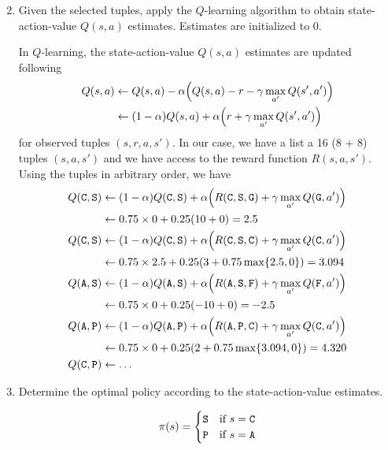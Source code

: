 \documentclass[11pt, a4paper]{article}
\begin{document}
\begin{enumerate}
    \setcounter{enumi}{1}
    \item Given the selected tuples, apply the $Q$-learning algorithm to obtain state-action-value $Q(s, a)$ estimates. Estimates are initialized to 0.

    \begin{solution}
        In $Q$-learning, the state-action-value $Q(s, a)$ estimates are updated following
        \begin{align*}
            Q(s, a) & \gets Q(s, a) - \alpha \rbk*{Q(s, a) - r - \gamma \max_{a'} Q(s', a')} \\
            & \gets (1 - \alpha) Q(s, a) + \alpha \rbk*{r + \gamma \max_{a'} Q(s', a')}
        \end{align*}
        for observed tuples $(s, r, a, s')$. In our case, we have a list a 16 (8 + 8) tuples $(s, a, s')$ and we have access to the reward function $R(s, a, s')$. Using the tuples in arbitrary order, we have
        \begin{align*}
            Q(\C, \S) & \gets (1 - \alpha) Q(\C, \S) + \alpha \rbk*{R(\C, \S, \G) + \gamma \max_{a'} Q(\G, a')} \\
            & \gets 0.75 \times 0 + 0.25 \rbk{10 + 0} = 2.5 \\
            Q(\C, \S) & \gets (1 - \alpha) Q(\C, \S) + \alpha \rbk*{R(\C, \S, \C) + \gamma \max_{a'} Q(\C, a')} \\
            & \gets 0.75 \times 2.5 + 0.25 \rbk{3 + 0.75 \max \cbk{2.5, 0}} = 3.094 \\
            Q(\A, \S) & \gets (1 - \alpha) Q(\A, \S) + \alpha \rbk*{R(\A, \S, \F) + \gamma \max_{a'} Q(\F, a')} \\
            & \gets 0.75 \times 0 + 0.25 \rbk{-10 + 0} = -2.5 \\
            Q(\A, \P) & \gets (1 - \alpha) Q(\A, \P) + \alpha \rbk*{R(\A, \P, \C) + \gamma \max_{a'} Q(\C, a')} \\
            & \gets 0.75 \times 0 + 0.25 \rbk{2 + 0.75 \max \cbk{3.094, 0}} = 4.320 \\
            Q(\C, \P) & \gets \dots
        \end{align*}
    \end{solution}

    \item Determine the optimal policy according to the state-action-value estimates.

    \begin{solution}
        \begin{equation*}
            \pi(s) = \begin{cases}
                \texttt{S} & \text{if } s = \texttt{C} \\
                \texttt{P} & \text{if } s = \texttt{A}
            \end{cases}
        \end{equation*}
    \end{solution}
\end{enumerate}
\end{document}
